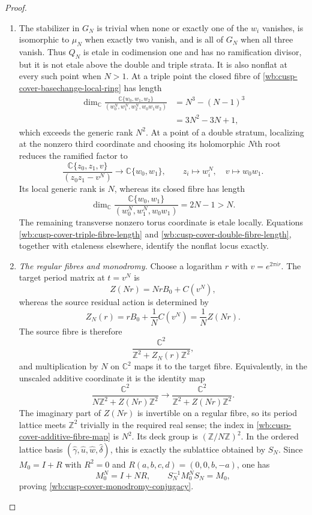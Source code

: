 \begin{proof}
\begin{enumerate}[label=\arabic*.,leftmargin=*]
\item The stabilizer in $G_N$ is trivial when none or exactly one of the $w_i$
vanishes, is isomorphic to $\mu_N$ when exactly two vanish, and is all of
$G_N$ when all three vanish.  Thus $Q_N$ is etale in codimension one and
has no ramification divisor, but it is not etale above the double and
triple strata.  It is also nonflat at every such point when $N>1$.  At a
triple point the closed fibre of \eqref{wb:cusp-cover-basechange-local-ring}
has length
\begin{align}
 \dim_{\mathbb C}
 \frac{\mathbb C\{w_0,w_1,w_2\}}
      {(w_0^N,w_1^N,w_2^N,w_0w_1w_2)}
 &=N^3-(N-1)^3\\
 &=3N^2-3N+1,
 \label{wb:cusp-cover-triple-fibre-length}
\end{align}
which exceeds the generic rank $N^2$.  At a point of a double stratum,
localizing at the nonzero third coordinate and choosing its holomorphic
$N$th root reduces the ramified factor to
\[
 \frac{\mathbb C\{z_0,z_1,v\}}{(z_0z_1-v^N)}
\longrightarrow\mathbb C\{w_0,w_1\},\qquad
 z_i\longmapsto w_i^N,\quad v\longmapsto w_0w_1.
\]
Its local generic rank is $N$, whereas its closed fibre has length
\begin{equation}
 \dim_{\mathbb C}
 \frac{\mathbb C\{w_0,w_1\}}
      {(w_0^N,w_1^N,w_0w_1)}=2N-1>N.
 \label{wb:cusp-cover-double-fibre-length}
\end{equation}
The remaining transverse nonzero torus coordinate is etale locally.
Equations \eqref{wb:cusp-cover-triple-fibre-length} and
\eqref{wb:cusp-cover-double-fibre-length}, together with etaleness elsewhere,
identify the nonflat locus exactly.

\item \medskip\noindent
\emph{The regular fibres and monodromy.}
Choose a logarithm $r$ with $v=e^{2\pi ir}$.  The target period matrix at
$t=v^N$ is
\[
 Z(Nr)=NrB_0+C(v^N),
\]
whereas the source residual action is determined by
\[
 Z_N(r)=rB_0+\frac1NC(v^N)=\frac1N Z(Nr).
\]
The source fibre is therefore
\[
 \frac{\mathbb C^2}{\mathbb Z^2+Z_N(r)\mathbb Z^2},
\]
and multiplication by $N$ on $\mathbb C^2$ maps it to the target fibre.
Equivalently, in the unscaled additive coordinate it is the identity map
\begin{equation}
 \frac{\mathbb C^2}
      {N\mathbb Z^2+Z(Nr)\mathbb Z^2}
 \longrightarrow
 \frac{\mathbb C^2}
      {\mathbb Z^2+Z(Nr)\mathbb Z^2}.
 \label{wb:cusp-cover-additive-fibre-map}
\end{equation}
The imaginary part of $Z(Nr)$ is invertible on a regular fibre, so its
period lattice meets $\mathbb Z^2$ trivially in the required real sense;
the index in \eqref{wb:cusp-cover-additive-fibre-map} is $N^2$.  Its deck
group is $(\mathbb Z/N\mathbb Z)^2$.  In the ordered lattice basis
$(\widehat\gamma,\widehat u,\widehat w,\widehat\delta)$, this is exactly
the sublattice obtained by $S_N$.  Since $M_0=I+R$ with $R^2=0$ and
$R(a,b,c,d)=(0,0,b,-a)$, one has
\[
 M_0^N=I+NR,\qquad S_N^{-1}M_0^NS_N=M_0,
\]
proving \eqref{wb:cusp-cover-monodromy-conjugacy}.


\end{enumerate}
\end{proof}
